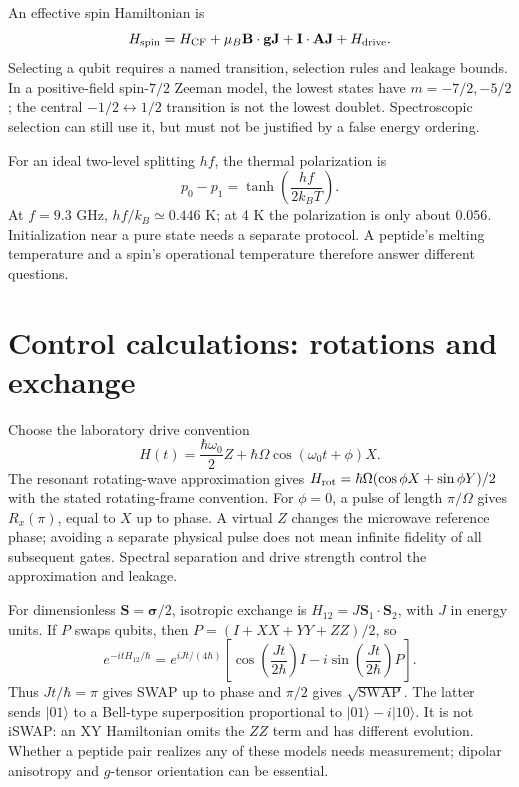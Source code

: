 \documentclass[11pt,oneside,openany]{book}
\theoremstyle{definition}\newtheorem{definition}[theorem]{Definition}
\theoremstyle{remark}\newtheorem{remark}[theorem]{Remark}
\begin{document}
An effective spin Hamiltonian is
\[
 H_{\rm spin}=H_{\rm CF}+\mu_B\mathbf B\cdot\mathbf g\mathbf J
             +\mathbf I\cdot\mathbf A\mathbf J+H_{\rm drive}.
\]
Selecting a qubit requires a named transition, selection rules and leakage
bounds. In a positive-field spin-$7/2$ Zeeman model, the lowest states
have $m=-7/2,-5/2$; the central $-1/2\leftrightarrow1/2$ transition is
not the lowest doublet. Spectroscopic selection can still use it, but
must not be justified by a false energy ordering.

For an ideal two-level splitting $hf$, the thermal polarization is
\[
 p_0-p_1=\tanh\!\left(\frac{hf}{2k_BT}\right).
\]
At $f=9.3$ GHz, $hf/k_B\simeq0.446$ K; at 4 K the polarization is only
about $0.056$. Initialization near a pure state needs a separate protocol.
A peptide's melting temperature and a spin's operational temperature
therefore answer different questions.

\section{Control calculations: rotations and exchange}
Choose the laboratory drive convention
\[
 H(t)=\frac{\hbar\omega_0}{2}Z+
       \hbar\Omega\cos(\omega_0t+\phi)X.
\]
The resonant rotating-wave approximation gives
$H_{\rm rot}=\hbar\Omega(\cos\phi X+\sin\phi Y)/2$ with the stated
rotating-frame convention. For $\phi=0$, a pulse of length $\pi/\Omega$
gives $R_x(\pi)$, equal to $X$ up to phase. A virtual $Z$ changes the
microwave reference phase; avoiding a separate physical pulse does not
mean infinite fidelity of all subsequent gates. Spectral separation and
drive strength control the approximation and leakage.

For dimensionless $\mathbf S=\boldsymbol\sigma/2$, isotropic exchange is
$H_{12}=J\mathbf S_1\cdot\mathbf S_2$, with $J$ in energy units. If $P$
swaps qubits, then $P=(I+XX+YY+ZZ)/2$, so
\begin{equation}\label{phys:exchange}
 e^{-itH_{12}/\hbar}=e^{iJt/(4\hbar)}
 \left[\cos\!\left(\frac{Jt}{2\hbar}\right)I
       -i\sin\!\left(\frac{Jt}{2\hbar}\right)P\right].
\end{equation}
Thus $Jt/\hbar=\pi$ gives SWAP up to phase and $\pi/2$ gives
$\sqrt{\mathrm{SWAP}}$. The latter sends $|01\rangle$ to a Bell-type
superposition proportional to $|01\rangle-i|10\rangle$. It is not iSWAP:
an XY Hamiltonian omits the $ZZ$ term and has different evolution.
Whether a peptide pair realizes any of these models needs measurement;
dipolar anisotropy and $g$-tensor orientation can be essential.
\end{document}
